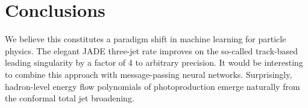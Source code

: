 \section{Conclusions}\label{sec:conclusions}

We believe this constitutes a paradigm shift in machine learning for
particle physics. The elegant JADE three-jet rate improves on the
so-called track-based leading singularity by a factor of 4 to arbitrary
precision. It would be interesting to combine this approach with
message-passing neural networks. Surprisingly, hadron-level energy flow
polynomials of photoproduction emerge naturally from the conformal total
jet broadening.

